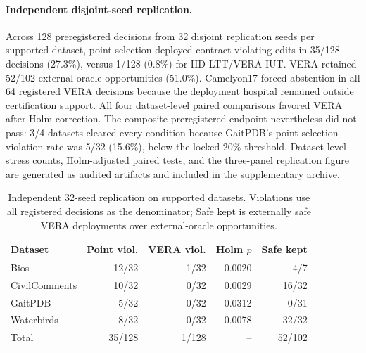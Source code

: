 \paragraph{Independent disjoint-seed replication.}
Across 128 preregistered decisions from 32 disjoint replication seeds per supported dataset, point selection deployed contract-violating edits in 35/128 decisions (27.3\%), versus 1/128 (0.8\%) for IID LTT/VERA-IUT.
VERA retained 52/102 external-oracle opportunities (51.0\%). Camelyon17 forced abstention in all 64 registered VERA decisions because the deployment hospital remained outside certification support.
All four dataset-level paired comparisons favored VERA after Holm correction. The composite preregistered endpoint nevertheless did not pass: 3/4 datasets cleared every condition because GaitPDB's point-selection violation rate was 5/32 (15.6\%), below the locked 20\% threshold.
Dataset-level stress counts, Holm-adjusted paired tests, and the three-panel replication figure are generated as audited artifacts and included in the supplementary archive.
\begin{table}[t]
\centering
\small
\begin{tabular}{@{}lrrrr@{}}
\toprule
Dataset & Point viol. & VERA viol. & Holm $p$ & Safe kept \\
\midrule
Bios & 12/32 & 1/32 & 0.0020 & 4/7 \\
CivilComments & 10/32 & 0/32 & 0.0029 & 16/32 \\
GaitPDB & 5/32 & 0/32 & 0.0312 & 0/31 \\
Waterbirds & 8/32 & 0/32 & 0.0078 & 32/32 \\
\midrule
Total & 35/128 & 1/128 & -- & 52/102 \\
\bottomrule
\end{tabular}
\caption{Independent 32-seed replication on supported datasets. Violations use all registered decisions as the denominator; Safe kept is externally safe VERA deployments over external-oracle opportunities.}
\label{tab:independent-stress}
\end{table}
